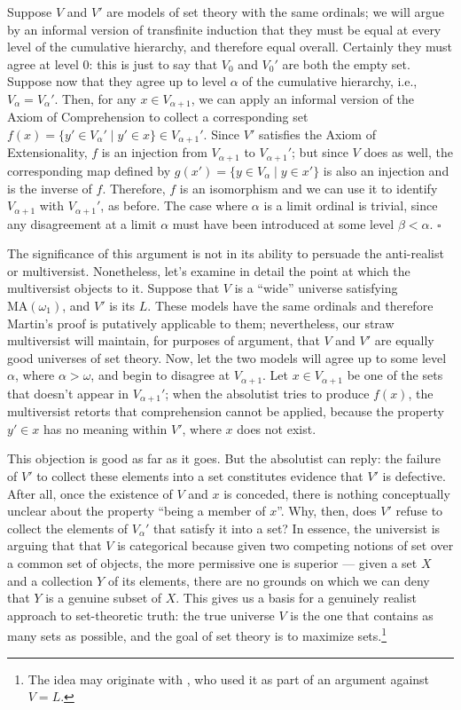 \documentclass[letterpaper,12pt]{article}
\begin{document}
Suppose $V$ and $V'$ are models of set theory with the same ordinals; we will argue by an informal version of transfinite induction that they must be equal at every level of the cumulative hierarchy, and therefore equal overall. Certainly they must agree at level $0$: this is just to say that $V_0$ and $V_0'$ are both the empty set. Suppose now that they agree up to level $\alpha$ of the cumulative hierarchy, i.e., $V_\alpha = V_\alpha'$. Then, for any $x \in V_{\alpha+1}$, we can apply an informal version of the Axiom of Comprehension to collect a corresponding set $f(x) = \{y' \in V_\alpha' \mid y' \in x\} \in V_{\alpha+1}'$. Since $V'$ satisfies the Axiom of Extensionality, $f$ is an injection from $V_{\alpha + 1}$ to $V_{\alpha+1}'$; but since $V$ does as well, the corresponding map defined by $g(x') = \{y \in V_\alpha \mid y \in x'\}$ is also an injection and is the inverse of $f$. Therefore, $f$ is an isomorphism and we can use it to identify $V_{\alpha+1}$ with $V_{\alpha+1}'$, as before. The case where $\alpha$ is a limit ordinal is trivial, since any disagreement at a limit $\alpha$ must have been introduced at some level $\beta < \alpha$. $\square$

The significance of this argument is not in its ability to persuade the anti-realist or multiversist. Nonetheless, let's examine in detail the point at which the multiversist objects to it. Suppose that $V$ is a ``wide'' universe satisfying $\mathrm{MA}(\omega_1)$, and $V'$ is its $L$. These models have the same ordinals and therefore Martin's proof is putatively applicable to them; nevertheless, our straw multiversist will maintain, for purposes of argument, that $V$ and $V'$ are equally good universes of set theory. Now, let  the two models will agree up to some level $\alpha$, where $\alpha > \omega$, and begin to disagree at $V_{\alpha + 1}$. Let $x \in V_{\alpha+1}$ be one of the sets that doesn't appear in $V_{\alpha+1}'$; when the absolutist tries to produce $f(x)$, the multiversist retorts that comprehension cannot be applied, because the property $y' \in x$ has no meaning within $V'$, where $x$ does not exist.

This objection is good as far as it goes. But the absolutist can reply: the failure of $V'$ to collect these elements into a set constitutes evidence that $V'$ is defective. After all, once the existence of $V$ and $x$ is conceded, there is nothing conceptually unclear about the property ``being a member of $x$''. Why, then, does $V'$ refuse to collect the elements of $V_\alpha'$ that satisfy it into a set? In essence, the universist is arguing that that $V$ is categorical because given two competing notions of set over a common set of objects, the more permissive one is superior --- given a set $X$ and a collection $Y$ of its elements, there are no grounds on which we can deny that $Y$ is a genuine subset of $X$. This gives us a basis for a genuinely realist approach to set-theoretic truth: the true universe $V$ is the one that contains as many sets as possible, and the goal of set theory is to maximize sets.\footnote{The idea may originate with \cite{Godel1964-GODWIC}, who used it as part of an argument against $V = L$.}
\end{document}
